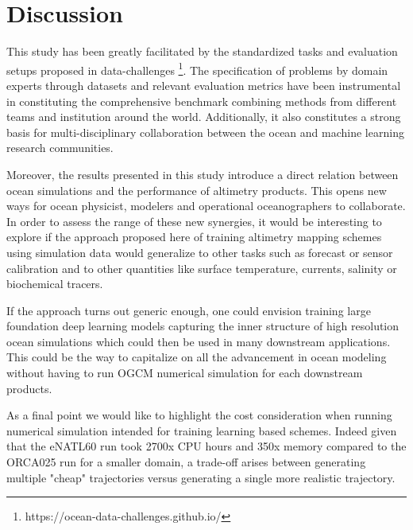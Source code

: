 \documentclass[draft]{agujournal2019}
\begin{document}
\section{Discussion}
\label{sec:discussion}
This study has been greatly facilitated by the standardized tasks and evaluation setups proposed in data-challenges \footnote{https://ocean-data-challenges.github.io/}. The specification of problems by domain experts through datasets and relevant evaluation metrics have been instrumental in constituting the comprehensive benchmark combining methods from different teams and institution around the world. Additionally, it also constitutes a strong basis for multi-disciplinary collaboration between the ocean and machine learning research communities.

Moreover, the results presented in this study introduce a direct relation between ocean simulations and the performance of altimetry products. This opens new ways for ocean physicist, modelers and operational oceanographers to collaborate. In order to assess the range of these new synergies, it would be interesting to explore if the approach proposed here of training altimetry mapping schemes using simulation data would generalize to other tasks such as forecast or sensor calibration and to other quantities like surface temperature, currents, salinity or biochemical tracers.

If the approach turns out generic enough, one could envision training large foundation deep learning models capturing the inner structure of high resolution ocean simulations which could then be used in many downstream applications. This could be the way to capitalize on all the advancement in ocean modeling without having to run OGCM numerical simulation for each downstream products.    

As a final point we would like to highlight the cost consideration when running numerical simulation intended for training learning based schemes. Indeed given that the eNATL60 run took 2700x CPU hours and 350x memory compared to the ORCA025 run for a smaller domain, a trade-off arises between generating multiple "cheap" trajectories versus generating  a single more realistic trajectory. 
\end{document}
